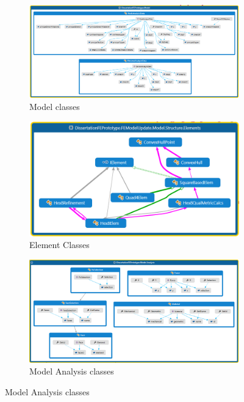 \begin{figure}[H]

\begin{subfigure}{.5\textwidth}
  \centering
  \includegraphics[width=0.9\linewidth]{../Graphics/DataModelStructure/Model.png}
  \caption{Model classes}
  \label{fig:sub1}
\end{subfigure}%
\begin{subfigure}{.5\textwidth}
  \centering
  \includegraphics[width=0.9\linewidth]{../Graphics/DataModelStructure/Elements.png}
  \caption{Element Classes}
  \label{fig:sub2}
\end{subfigure}
\begin{subfigure}{.5\textwidth}
  \centering
  \includegraphics[width=0.9\linewidth]{../Graphics/DataModelStructure/ModelAnalysis.png}
  \caption{Model Analysis classes}

\end{subfigure}
\end{figure}
